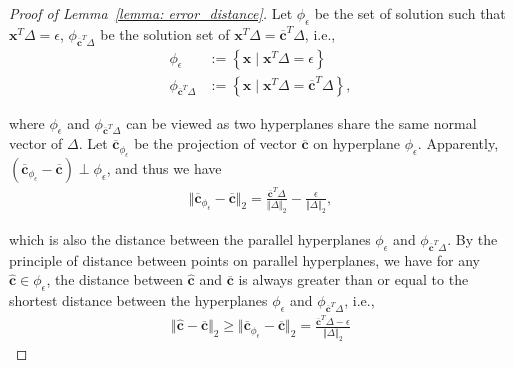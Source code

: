 \begin{proof}[Proof of Lemma~\ref{lemma: error_distance}]

Let $\phi_\epsilon$ be the set of solution such that $\boldsymbol{x}^T \Delta = \epsilon$,
$\phi_{\boldsymbol{\overline{c}}^T \Delta}$ be the solution set of $\boldsymbol{x}^T \Delta = \boldsymbol{\overline{c}}^T \Delta$,
i.e., 
\[
\begin{aligned}
\phi_{\epsilon} & :=\left\{ \boldsymbol{x} \mid \boldsymbol{x}^T \Delta = \epsilon\right\}\\
\phi_{\boldsymbol{\overline{c}}^T \Delta} &:=\left\{ \boldsymbol{x} \mid \boldsymbol{x}^T \Delta = \boldsymbol{\overline{c}}^T \Delta \right\},
\end{aligned}
\]

where $\phi_{\epsilon}$ and $\phi_{\boldsymbol{\overline{c}}^T \Delta}$ can be viewed as two hyperplanes share the same normal vector of $\Delta$. Let $\boldsymbol{\overline{c}}_{\phi_{\epsilon}}$ be the projection of vector $\boldsymbol{\overline{c}}$ on hyperplane $\phi_{\epsilon}$. Apparently, $\left( \boldsymbol{\overline{c}}_{\phi_{\epsilon}} - \boldsymbol{\overline{c}} \right) \perp \phi_{\epsilon}$, and thus we have
\begin{equation}
\begin{aligned}
\Vert \boldsymbol{\overline{c}}_{\phi_{\epsilon}} - \boldsymbol{\overline{c}} \Vert_2 = \frac{\boldsymbol{\overline{c}}^T \Delta}{\Vert \Delta \Vert_2}
-
\frac{\epsilon}{\Vert \Delta \Vert_2},
\end{aligned}
\end{equation}

which is also the distance between the parallel hyperplanes $\phi_{\epsilon}$ and $\phi_{ \boldsymbol{\overline{c}}^T \Delta }$.
By the principle of distance between points on parallel hyperplanes, we have for any $\boldsymbol{\hat{c}} \in \phi_{\epsilon}$, the distance between 
$\boldsymbol{\hat{c}}$ and $\boldsymbol{\overline{c}}$ is always greater than or equal to the shortest distance between the hyperplanes $\phi_{\epsilon}$ and $\phi_{\boldsymbol{\overline{c}}^T \Delta }$, i.e.,
\begin{equation}
\begin{aligned}
\Vert \boldsymbol{\hat{c}} - \boldsymbol{\overline{c}} \Vert_2
\geq
\Vert \boldsymbol{\overline{c}}_{\phi_{\epsilon}} - \boldsymbol{\overline{c}} \Vert_2 = \frac{\boldsymbol{\overline{c}}^T \Delta - \epsilon }{\Vert \Delta \Vert_2}
\end{aligned}
\end{equation}
\end{proof}


